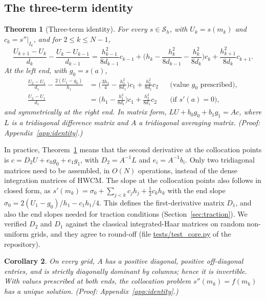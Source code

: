 \documentclass[preprint,12pt]{elsarticle}
\newtheorem{theorem}{Theorem}
\newtheorem{corollary}[theorem]{Corollary}
\theoremstyle{remark}
\newcommand{\proofin}[1]{\hfill{\small\emph{(Proof: Appendix~\ref{#1}.)}}}
\begin{document}
\subsection{The three-term identity}
\begin{theorem}[Three-term identity]\label{thm:identity}
For every $s\in\mathcal S_h$, with $U_k=s(m_k)$ and $c_k=s''|_{I_k}$, and for $2\le k\le N-1$,
\begin{equation}\label{eq:interior}
\frac{U_{k+1}-U_k}{d_k}-\frac{U_k-U_{k-1}}{d_{k-1}}
=\frac{h_{k-1}^2}{8d_{k-1}}c_{k-1}+\Big(h_k-\frac{h_k^2}{8d_{k-1}}-\frac{h_k^2}{8d_k}\Big)c_k+\frac{h_{k+1}^2}{8d_k}c_{k+1}.
\end{equation}
At the left end, with $g_0=s(a)$,
\begin{align}
\frac{U_2-U_1}{d_1}-\frac{2(U_1-g_0)}{h_1}&=\Big(\frac{3h_1}{4}-\frac{h_1^2}{8d_1}\Big)c_1+\frac{h_2^2}{8d_1}c_2 &&\text{(value $g_0$ prescribed)},\label{eq:dirrow}\\
\frac{U_2-U_1}{d_1}&=\Big(h_1-\frac{h_1^2}{8d_1}\Big)c_1+\frac{h_2^2}{8d_1}c_2 &&\text{(if } s'(a)=0),\label{eq:neurow}
\end{align}
and symmetrically at the right end. In matrix form, $LU+b_0g_0+b_1g_1=Ac$, where $L$ is a tridiagonal
difference matrix and $A$ a tridiagonal averaging matrix.
\proofin{app:identity}
\end{theorem}

In practice, Theorem~\ref{thm:identity} means that the second derivative at the collocation points is
$c=D_2U+e_0g_0+e_1g_1$, with $D_2=A^{-1}L$ and $e_i=A^{-1}b_i$. Only two tridiagonal matrices need to
be assembled, in $O(N)$ operations, instead of the dense integration matrices of HWCM. The slope at the
collocation points also follows in closed form, as
$s'(m_k)=\sigma_0+\sum_{j<k}c_jh_j+\tfrac12c_kh_k$ with the end slope
$\sigma_0=2(U_1-g_0)/h_1-c_1h_1/4$. This defines the first-derivative matrix $D_1$, and also the end
slopes needed for traction conditions (Section~\ref{sec:traction}). We verified $D_2$ and $D_1$ against
the classical integrated-Haar matrices on random non-uniform grids, and they agree to round-off
(file \url{tests/test_core.py} of the repository).

\begin{corollary}\label{cor:ops}
On every grid, $A$ has a positive diagonal, positive off-diagonal entries, and is strictly diagonally
dominant by columns; hence it is invertible. With values prescribed at both ends, the collocation
problem $s''(m_k)=f(m_k)$ has a unique solution.
\proofin{app:identity}
\end{corollary}
\end{document}
